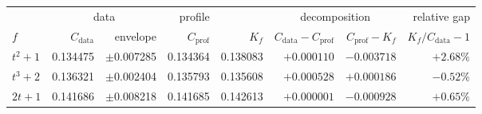 \begin{tabular}{@{}lrrrrrrr@{}}
\toprule
& \multicolumn{2}{c}{data} & profile & & \multicolumn{2}{c}{decomposition} & relative gap \\
\cmidrule(lr){2-3}\cmidrule(lr){4-4}\cmidrule(lr){6-7}\cmidrule(l){8-8}
$f$ & $C_{\mathrm{data}}$ & envelope & $C_{\mathrm{prof}}$ & $K_f$ & $C_{\mathrm{data}}-C_{\mathrm{prof}}$ & $C_{\mathrm{prof}}-K_f$ & $K_f/C_{\mathrm{data}}-1$ \\
\midrule
$t^2+1$ & 0.134475 & $\pm$0.007285 & 0.134364 & 0.138083 & $+0.000110$ & $-0.003718$ & $+2.68\%$ \\
$t^3+2$ & 0.136321 & $\pm$0.002404 & 0.135793 & 0.135608 & $+0.000528$ & $+0.000186$ & $-0.52\%$ \\
$2t+1$ & 0.141686 & $\pm$0.008218 & 0.141685 & 0.142613 & $+0.000001$ & $-0.000928$ & $+0.65\%$ \\
\bottomrule
\end{tabular}
